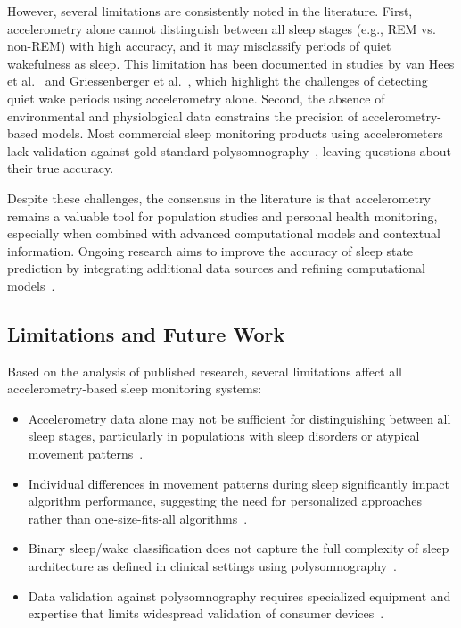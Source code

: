 \documentclass[conference]{IEEEtran}
\begin{document}
However, several limitations are consistently noted in the literature. First, accelerometry alone cannot distinguish between all sleep stages (e.g., REM vs. non-REM) with high accuracy, and it may misclassify periods of quiet wakefulness as sleep. This limitation has been documented in studies by van Hees et al.~\cite{vanHees2015} and Griessenberger et al.~\cite{griessenberger2013}, which highlight the challenges of detecting quiet wake periods using accelerometry alone. Second, the absence of environmental and physiological data constrains the precision of accelerometry-based models. Most commercial sleep monitoring products using accelerometers lack validation against gold standard polysomnography~\cite{researchgate2021, behar2013}, leaving questions about their true accuracy.

Despite these challenges, the consensus in the literature is that accelerometry remains a valuable tool for population studies and personal health monitoring, especially when combined with advanced computational models and contextual information. Ongoing research aims to improve the accuracy of sleep state prediction by integrating additional data sources and refining computational models~\cite{zhang2020machine, vanHees2015, behar2013}.

\subsection{Limitations and Future Work}
Based on the analysis of published research, several limitations affect all accelerometry-based sleep monitoring systems:

\begin{itemize}
	\item Accelerometry data alone may not be sufficient for distinguishing between all sleep stages, particularly in populations with sleep disorders or atypical movement patterns~\cite{griessenberger2013, sadeh2011}.
	\item Individual differences in movement patterns during sleep significantly impact algorithm performance, suggesting the need for personalized approaches rather than one-size-fits-all algorithms~\cite{sadeh2011, kushida2001}.
	\item Binary sleep/wake classification does not capture the full complexity of sleep architecture as defined in clinical settings using polysomnography~\cite{rechtschaffen1968, aasm2007}.
	\item Data validation against polysomnography requires specialized equipment and expertise that limits widespread validation of consumer devices~\cite{littner2003, behar2013}.
\end{itemize}
\end{document}

